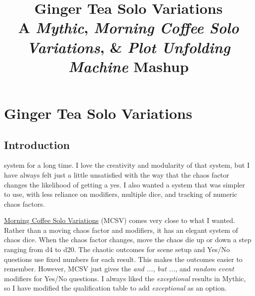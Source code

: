 

\title{
\Huge{Ginger Tea Solo Variations}
\\ \small{A \emph{Mythic}, \emph{Morning Coffee Solo Variations}, \& \emph{Plot Unfolding Machine} Mashup}
}


\frontmatter

\mainmatter

\chapter*{Ginger Tea Solo Variations \version}
\section{Introduction}
system for a long time. I love the creativity and modularity of that system,
but I have always felt just a little unsatisfied with the way that the chaos
factor changes the likelihood of getting a yes. I also wanted a system
that was simpler to use, with less reliance on modifiers, multiple dice, and
tracking of numeric chaos factors.

\href{https://aleaiactandaest.blogspot.com/p/downloads.html}{Morning Coffee Solo
Variations} (MCSV) comes very close to what I wanted. Rather than a moving chaos
factor and modifiers, it has an elegant system of chaos dice. When the chaos
factor changes, move the chaos die up or down a step ranging from d4 to d20. The
chaotic outcomes for scene setup and Yes/No questions use fixed numbers for each
result. This makes the outcomes easier to remember. However, MCSV just gives the
\emph{and ...}, \emph{but ...}, and \emph{random event} modifiers for Yes/No
questions. I always liked the \emph{exceptional} results in Mythic, so I have
modified the qualification table to add \emph{exceptional} as an option.

